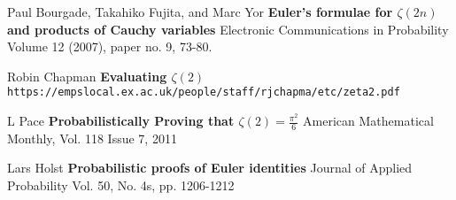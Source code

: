 \documentclass[12pt]{article}
\begin{document}
\vfill
\begin{thebibliography}{}

\item Paul Bourgade, Takahiko Fujita, and Marc Yor \textbf{Euler's formulae for $\zeta(2n)$ and products of Cauchy variables} Electronic Communications in Probability Volume 12 (2007), paper no. 9, 73-80.

\item Robin Chapman \textbf{Evaluating $\zeta(2)$} \texttt{https://empslocal.ex.ac.uk/people/staff/rjchapma/etc/zeta2.pdf}

\item L Pace \textbf{Probabilistically Proving that $\zeta(2) = \frac{\pi^2}{6}$}
American Mathematical Monthly, Vol. 118 Issue 7, 2011

\item Lars Holst \textbf{Probabilistic proofs of Euler identities}
Journal of Applied Probability
Vol. 50, No. 4s, pp. 1206-1212

\end{thebibliography}
\end{document}
